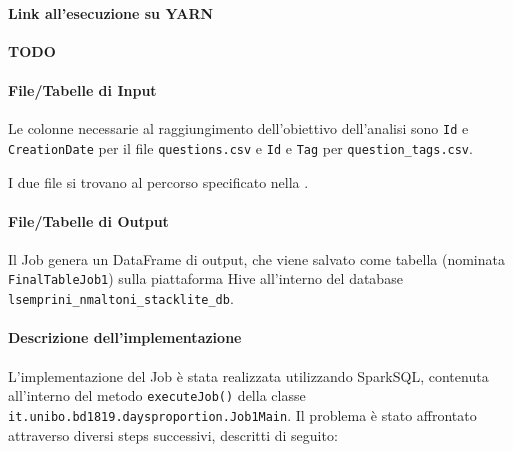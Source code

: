   \paragraph{Link all'esecuzione su YARN}\label{par:job1:spark:yarn}

  \textbf{TODO}

  \paragraph{File/Tabelle di Input}\label{par:job1:spark:input}

  Le colonne necessarie al raggiungimento dell'obiettivo dell'analisi sono \texttt{Id} e \texttt{CreationDate} per il file \texttt{questions.csv}
  e \texttt{Id} e \texttt{Tag} per \texttt{question\_tags.csv}.

  I due file si trovano al percorso specificato nella .

  \paragraph{File/Tabelle di Output}\label{par:job1:spark:output}

  Il Job genera un DataFrame di output, che viene salvato come tabella (nominata \texttt{FinalTableJob1})
  sulla piattaforma Hive all'interno del database \texttt{lsemprini\_nmaltoni\_stacklite\_db}.

  \paragraph{Descrizione dell'implementazione}\label{par:job1:spark:implementation}

  L'implementazione del Job è stata realizzata utilizzando SparkSQL, contenuta all'interno del metodo \texttt{executeJob()}
  della classe \texttt{it.unibo.bd1819.daysproportion.Job1Main}.
  Il problema è stato affrontato attraverso diversi steps successivi, descritti di seguito:

